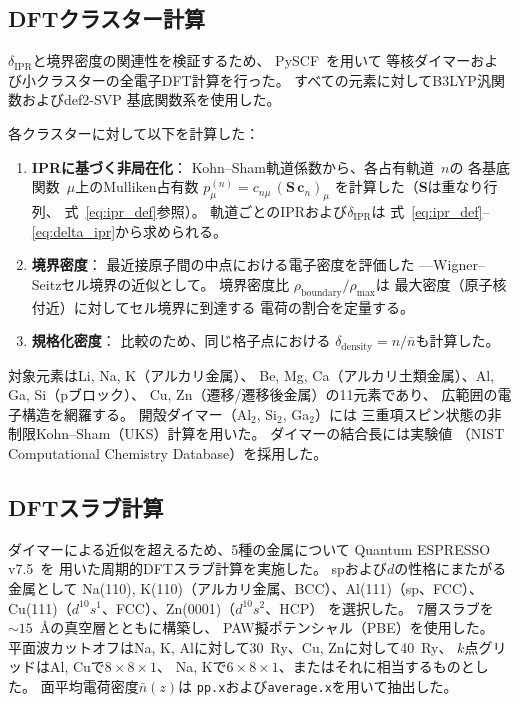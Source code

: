 \documentclass[twocolumn,showpacs,preprintnumbers,amsmath,amssymb,prb]{revtex4-2}
\begin{document}
\subsection{DFTクラスター計算}

$\delta_\mathrm{IPR}$と境界密度の関連性を検証するため、
PySCF~\cite{PySCF2018}を用いて
等核ダイマーおよび小クラスターの全電子DFT計算を行った。
すべての元素に対してB3LYP汎関数およびdef2-SVP
基底関数系を使用した。

各クラスターに対して以下を計算した：
\begin{enumerate}
  \item \textbf{IPRに基づく非局在化}：
    Kohn--Sham軌道係数から、各占有軌道~$n$の
    各基底関数~$\mu$上のMulliken占有数
    $p_\mu^{(n)} = c_{n\mu}\,(\mathbf{S}\,\mathbf{c}_n)_\mu$
    を計算した（$\mathbf{S}$は重なり行列、
    式~\eqref{eq:ipr_def}参照）。
    軌道ごとのIPRおよび$\delta_\mathrm{IPR}$は
    式~\eqref{eq:ipr_def}--\eqref{eq:delta_ipr}から求められる。

  \item \textbf{境界密度}：
    最近接原子間の中点における電子密度を評価した
    ---Wigner--Seitzセル境界の近似として。
    境界密度比
    $\rho_\mathrm{boundary} / \rho_\mathrm{max}$は
    最大密度（原子核付近）に対してセル境界に到達する
    電荷の割合を定量する。

  \item \textbf{規格化密度}：
    比較のため、同じ格子点における
    $\delta_\mathrm{density} = n / \bar{n}$も計算した。
\end{enumerate}

対象元素はLi, Na, K（アルカリ金属）、
Be, Mg, Ca（アルカリ土類金属）、Al, Ga, Si（pブロック）、
Cu, Zn（遷移/遷移後金属）の11元素であり、
広範囲の電子構造を網羅する。
開殻ダイマー（Al$_2$, Si$_2$, Ga$_2$）には
三重項スピン状態の非制限Kohn--Sham（UKS）計算を用いた。
ダイマーの結合長には実験値
（NIST Computational Chemistry Database）を採用した。

\subsection{DFTスラブ計算}

ダイマーによる近似を超えるため、5種の金属について
Quantum ESPRESSO v7.5~\cite{Giannozzi2009,Giannozzi2017}を
用いた周期的DFTスラブ計算を実施した。
spおよび$d$の性格にまたがる金属として
Na(110), K(110)（アルカリ金属、BCC）、Al(111)（sp、FCC）、
Cu(111)（$d^{10}s^1$、FCC）、Zn(0001)（$d^{10}s^2$、HCP）
を選択した。
7層スラブを$\sim\!15$~\AA の真空層とともに構築し、
PAW擬ポテンシャル（PBE）を使用した。
平面波カットオフはNa, K, Alに対して30~Ry、Cu, Znに対して40~Ry、
$k$点グリッドはAl, Cuで$8 \times 8 \times 1$、
Na, Kで$6 \times 8 \times 1$、またはそれに相当するものとした。
面平均電荷密度$\bar{n}(z)$は
\texttt{pp.x}および\texttt{average.x}を用いて抽出した。
\end{document}
